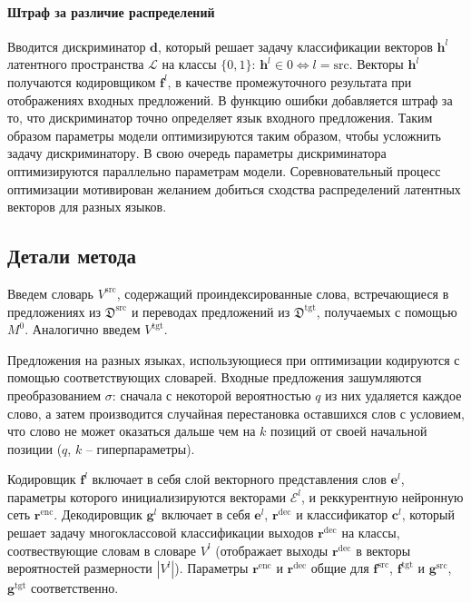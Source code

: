 \documentclass[12pt,twoside]{article}
\begin{document}
   \paragraph{Штраф за различие распределений} Вводится дискриминатор $\textbf{d}$, который решает задачу классификации векторов $\textbf{h}^l$ латентного пространства $\mathcal{L}$ на классы $\{0, 1\}$: $\textbf{h}^l \in 0 \Leftrightarrow l = \text{src}$. Векторы $\textbf{h}^l$ получаются кодировщиком $\textbf{f}^{l}$, в качестве промежуточного результата при отображениях входных предложений. В функцию ошибки добавляется штраф за то, что дискриминатор точно определяет язык входного предложения. Таким образом параметры модели оптимизируются таким образом, чтобы усложнить задачу дискриминатору. В свою очередь параметры дискриминатора оптимизируются параллельно параметрам модели. Соревновательный процесс оптимизации мотивирован желанием добиться сходства распределений латентных векторов для разных языков.

\subsection{Детали метода}
   Введем словарь $V^{\text{src}}$, содержащий проиндексированные слова, встречающиеся в предложениях из $\mathfrak{D}^{\text{src}}$ и переводах предложений из  $\mathfrak{D}^{\text{tgt}}$, получаемых с помощью $M^0$. Аналогично введем $V^{\text{tgt}}$.

   Предложения на разных языках, использующиеся при оптимизации кодируются с помощью соответствующих словарей. Входные предложения зашумляются преобразованием $\sigma$: сначала с некоторой вероятностью $q$ из них удаляется каждое слово, а затем производится случайная перестановка оставшихся слов с условием, что слово не может оказаться дальше чем на $k$ позиций от своей начальной позиции ($q$, $k$ -- гиперпараметры).

   Кодировщик $\textbf{f}^{l}$ включает в себя слой векторного представления слов $\textbf{e}^{l}$, параметры которого инициализируются векторами $\mathcal{E}^{l}$, и реккурентную нейронную сеть $\textbf{r}^{\text{enc}}$. Декодировщик $\textbf{g}^{l}$ включает в себя $\textbf{e}^{l}$, $\textbf{r}^{\text{dec}}$ и классификатор $\textbf{c}^{l}$, который решает задачу многоклассовой классификации выходов $\textbf{r}^{\text{dec}}$ на классы, соотвествующие словам в словаре $V^{l}$ (отображает выходы $\textbf{r}^{\text{dec}}$ в векторы вероятностей размерности $|V^{l}|$). Параметры $\textbf{r}^{\text{enc}}$ и $\textbf{r}^{\text{dec}}$ общие для $\textbf{f}^{\text{src}}$, $\textbf{f}^{\text{tgt}}$ и $\textbf{g}^{\text{src}}$, $\textbf{g}^{\text{tgt}}$ соответственно.
\end{document}
